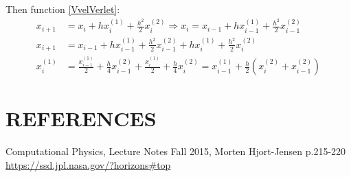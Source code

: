 \documentclass[a4paper]{article}
\begin{document}
Then function \ref{VvelVerlet}:
\begin{align}
x_{i+1} &= x_i + hx_i^{(1)} + \frac{h^2}{2} x_i^{(2)} \Rightarrow x_{i} = x_{i-1} + hx_{i-1}^{(1)} + \frac{h^2}{2} x_{i-1}^{(2)} \\
x_{i+1} &= x_{i-1} + hx_{i-1}^{(1)} + \frac{h^2}{2} x_{i-1}^{(2)} + hx_i^{(1)} + \frac{h^2}{2} x_i^{(2)} \\
x_i^{(1)} &= \frac{x_{i-1}^{(1)}}{2} + \frac{h}{4} x_{i-1}^{(2)} + \frac{x_i^{(1)}}{2} + \frac{h}{4} x_i^{(2)}
= x_{i-1}^{(1)} + \frac{h}{2} \left( x_i^{(2)} + x_{i-1}^{(2)} \right) 
\end{align}


\section{REFERENCES}
\begin{thebibliography}{9}
	Computational Physics, Lecture Notes Fall 2015, Morten Hjort-Jensen p.215-220
	\url{https://ssd.jpl.nasa.gov/?horizons#top}
\end{thebibliography}




\end{document}
